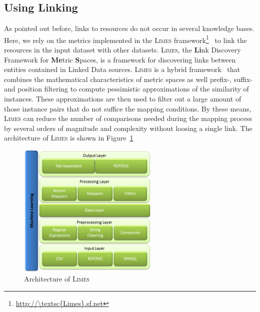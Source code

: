 \documentclass[a4paper,twoside,bibtotoc,abstracton,12pt,BCOR=15mm]{article}
\newcommand{\limes}{\textsc{Limes}\xspace}
\begin{document}
\subsection{Using Linking}
As pointed out before, links to resources do not occur in several knowledge bases.
Here, we rely on the metrics implemented in the \limes framework\footnote{\url{http://\limes.sf.net}}~\cite{NGAU11,NGON12c,NGO+13c} to link the resources in the input dataset with other datasets.
\limes, the \textbf{Li}nk Discovery Framework for \textbf{Me}tric \textbf{S}paces, is a framework for discovering links between entities contained in Linked Data sources. \limes is a hybrid framework~\cite{NGON12c} that combines the mathematical characteristics of metric spaces as well prefix-, suffix- and position filtering to compute pessimistic approximations of the similarity of instances. These approximations are then used to filter out a large amount of those instance pairs that do not suffice the mapping conditions. By these means, \limes can reduce the number of comparisons needed during the mapping process by several orders of magnitude and complexity without loosing a single link.
The architecture of \limes is shown in Figure~\ref{fig:limesArchitecture}

\begin{figure}[ht!]
  \centering
  \includegraphics[width = 0.6\textwidth]{images/limesArchitecture.png}
  \caption{Architecture of \limes}
  \label{fig:limesArchitecture}
\end{figure}
		
\end{document}
